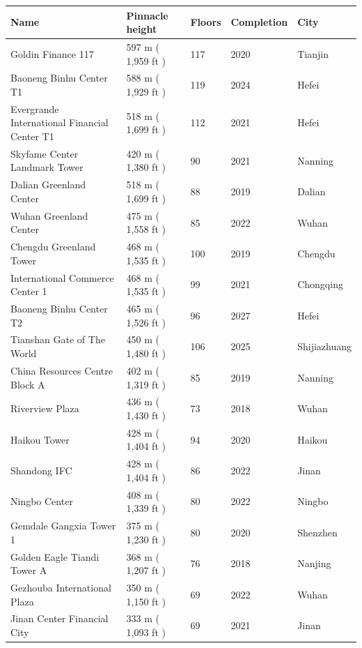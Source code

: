 \documentclass{article}
\begin{document}
\begin{tabular}{lllll}
\toprule
Name & Pinnacle height & Floors & Completion & City \\
\midrule
Goldin Finance 117 & 597 m ( 1,959 ft ) & 117 & 2020 & Tianjin \\
Baoneng Binhu Center T1 & 588 m ( 1,929 ft ) & 119 & 2024 & Hefei \\
Evergrande International Financial Center T1 & 518 m ( 1,699 ft ) & 112 & 2021 & Hefei \\
Skyfame Center Landmark Tower & 420 m ( 1,380 ft ) & 90 & 2021 & Nanning \\
Dalian Greenland Center & 518 m ( 1,699 ft ) & 88 & 2019 & Dalian \\
Wuhan Greenland Center & 475 m ( 1,558 ft ) & 85 & 2022 & Wuhan \\
Chengdu Greenland Tower & 468 m ( 1,535 ft ) & 100 & 2019 & Chengdu \\
International Commerce Center 1 & 468 m ( 1,535 ft ) & 99 & 2021 & Chongqing \\
Baoneng Binhu Center T2 & 465 m ( 1,526 ft ) & 96 & 2027 & Hefei \\
Tianshan Gate of The World & 450 m ( 1,480 ft ) & 106 & 2025 & Shijiazhuang \\
China Resources Centre Block A & 402 m ( 1,319 ft ) & 85 & 2019 & Nanning \\
Riverview Plaza & 436 m ( 1,430 ft ) & 73 & 2018 & Wuhan \\
Haikou Tower & 428 m ( 1,404 ft ) & 94 & 2020 & Haikou \\
Shandong IFC & 428 m ( 1,404 ft ) & 86 & 2022 & Jinan \\
Ningbo Center & 408 m ( 1,339 ft ) & 80 & 2022 & Ningbo \\
Gemdale Gangxia Tower 1 & 375 m ( 1,230 ft ) & 80 & 2020 & Shenzhen \\
Golden Eagle Tiandi Tower A & 368 m ( 1,207 ft ) & 76 & 2018 & Nanjing \\
Gezhouba International Plaza & 350 m ( 1,150 ft ) & 69 & 2022 & Wuhan \\
Jinan Center Financial City & 333 m ( 1,093 ft ) & 69 & 2021 & Jinan \\
\bottomrule
\end{tabular}
\end{document}
